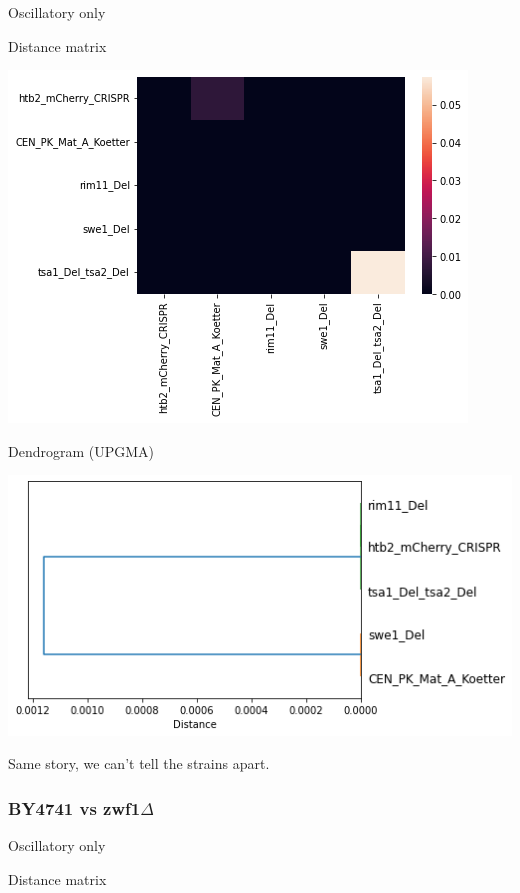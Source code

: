 Oscillatory only
\label{sec:org803a4be}

Distance matrix

\begin{center}
\includegraphics[width=.9\linewidth]{MIHierClust_20212_osc_distmatrix.png}
\end{center}

Dendrogram (UPGMA)

\begin{center}
\includegraphics[width=.9\linewidth]{MIHierClust_20212_osc_dendrogram.png}
\end{center}

Same story, we can't tell the strains apart.

\subsubsection{BY4741 vs zwf1$\Delta$}
\label{sec:org7a4d63f}

Oscillatory only
\label{sec:org3fdb03d}

Distance matrix

